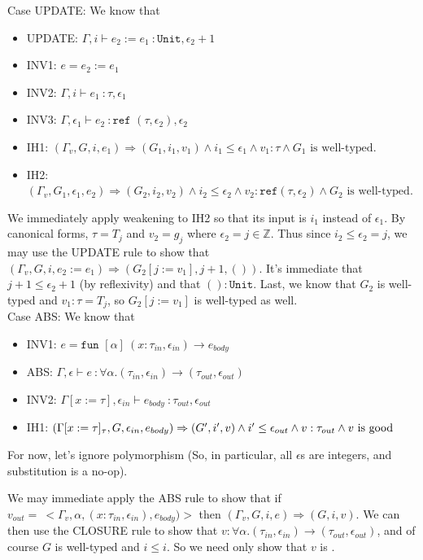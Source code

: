 \documentclass{article}
\newcommand{\Z}{\mathbb{Z}}
\begin{document}
Case UPDATE: We know that
\begin{itemize}
	\item UPDATE: $\Gamma, i \vdash e_2 := e_1\ \colon \texttt{Unit}, \epsilon_2 + 1$
	\item INV1: $e = e_2 := e_1$
	\item INV2: $\Gamma, i \vdash e_1\ \colon \tau, \epsilon_1$
	\item INV3: $\Gamma, \epsilon_1 \vdash e_2\ \colon \texttt{ref }(\tau, \epsilon_2), \epsilon_2$
	\item IH1: $(\Gamma_v, G, i, e_1) \Rightarrow (G_1, i_1, v_1) \wedge i_1 \leq \epsilon_1 \wedge v_1 : \tau \wedge G_1 \mbox{ is well-typed}$.
	\item IH2: $(\Gamma_v, G_1, \epsilon_1, e_2) \Rightarrow (G_2, i_2, v_2) \wedge i_2 \leq \epsilon_2 \wedge v_2 : \texttt{ref}(\tau, \epsilon_2) \wedge G_2 \mbox{ is well-typed}$.
\end{itemize}
We immediately apply weakening to IH2 so that its input is $i_1$ instead of $\epsilon_1$. By canonical forms, $\tau = T_j$ and $v_2 = g_j$ where $\epsilon_2 = j \in \Z$. Thus since $i_2 \leq \epsilon_2 = j$, we may use the UPDATE rule to show that $(\Gamma_v, G, i, e_2 := e_1) \Rightarrow (G_2[j := v_1], j+1, ())$. It's immediate that $j+1 \leq \epsilon_2+1$ (by reflexivity) and that $() : \texttt{Unit}$. Last, we know that $G_2$ is well-typed and $v_1 : \tau = T_j$, so $G_2[j := v_1]$ is well-typed as well.
\\

Case ABS: We know that 
\begin{itemize}
	\item INV1: $e = \texttt{fun } [\alpha]\ (x : \tau_{in}, \epsilon_{in}) \rightarrow e_{body}$
	\item ABS: $\Gamma, \epsilon \vdash e\ \colon \forall \alpha.(\tau_{in}, \epsilon_{in}) \rightarrow (\tau_{out}, \epsilon_{out})$
	\item INV2: $\Gamma[x := \tau], \epsilon_{in} \vdash e_{body}\ \colon \tau_{out}, \epsilon_{out}$
	\item IH1: $(\Gamma[x := \tau]_\tau, G, \epsilon_{in}, e_{body}) \Rightarrow (G', i', v) \wedge i' \leq \epsilon_{out} \wedge v : \tau_{out} \wedge v \mbox{ is good}$
\end{itemize}
For now, let's ignore polymorphism (So, in particular, all $\epsilon$s are integers, and substitution is a no-op).

We may immediate apply the ABS rule to show that if $v_{out} =\ <\Gamma_v, \alpha, (x : \tau_{in}, \epsilon_{in}), e_{body})>$ then
$(\Gamma_v, G, i, e) \Rightarrow (G, i, v)$. We can then use the CLOSURE rule to show that $v : \forall \alpha.(\tau_{in}, \epsilon_{in}) \rightarrow (\tau_{out}, \epsilon_{out})$, and of course $G$ is well-typed and $i \leq i$. So we need only show that $v$ is \okvalue. 
\end{document}
